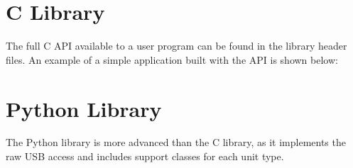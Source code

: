 \section{C Library}

The full C API available to a user program can be found in the library header files. An example of a simple application built with the API is shown below:


\section{Python Library}

The Python library is more advanced than the C library, as it implements the raw USB access and includes support classes for each unit type. 









